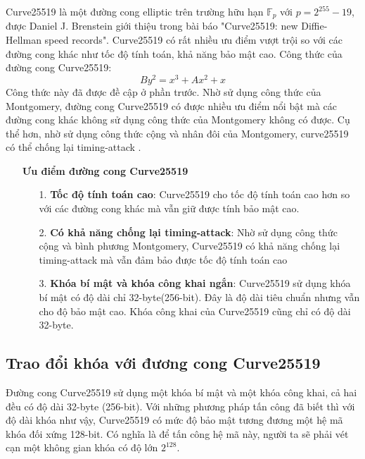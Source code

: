 \documentclass[a4paper,12pt]{report}
\begin{document}
Curve25519 là một đường cong elliptic trên trường hữu hạn $\mathbb{F}_p$ với $p = 2^{255} - 19$, được Daniel J. Brenstein giới thiệu trong bài báo "Curve25519: new Diffie-Hellman speed records". Curve25519 có rất nhiều ưu điểm vượt trội so với các đường cong khác như tốc độ tính toán,
khả năng bảo mật cao. Công thức của đường cong Curve25519:
\begin{displaymath}
By^2 = x^3 + Ax^2 + x
\end{displaymath}
Công thức này đã được đề cập ở phần trước. Nhờ sử dụng công thức của Montgomery, đường cong Curve25519 có được nhiều ưu điểm nổi bật mà các đường cong khác không sử dụng công thức của Montgomery không có được. Cụ
thể hơn, nhờ sử dụng công thức cộng và nhân đôi của Montgomery, curve25519 có thể chống lại timing-attack .
\begin{itemize}
\item[] \textbf{Ưu điểm đường cong Curve25519}
\begin{itemize}
\item[1. ] \textbf{Tốc độ tính toán cao}: Curve25519 cho tốc độ tính toán cao hơn so với các đường cong khác mà vẫn giữ được tính bảo mật cao.
\item[2. ] \textbf{Có khả năng chống lại timing-attack}: Nhờ sử dụng công thức cộng và bình phương Montgomery, Curve25519 có khả năng chống lại timing-attack mà vẫn đảm bảo được tốc độ tính toán cao
\item[3. ] \textbf{Khóa bí mật và khóa công khai ngắn}: Curve25519 sử dụng khóa bí mật có độ dài chỉ 32-byte(256-bit). Đây là độ dài tiêu chuẩn nhưng vẫn cho độ bảo mật cao. Khóa công khai của Curve25519 cũng chỉ có độ dài 32-byte.
\end{itemize}
\end{itemize}
\subsection{Trao đổi khóa với đương cong Curve25519}
Đường cong Curve25519 sử dụng một khóa bí mật và một khóa công khai, cả hai đều có độ dài 32-byte (256-bit). Với những phương pháp tấn công đã biết thì với độ dài khóa như vậy, Curve25519 có mức độ bảo mật tương đương một hệ mã khóa đối xứng 128-bit. Có nghĩa là để tấn công hệ mã này, người ta sẽ phải vét cạn một không gian khóa có độ lớn $2^{128}$.
\end{document}
